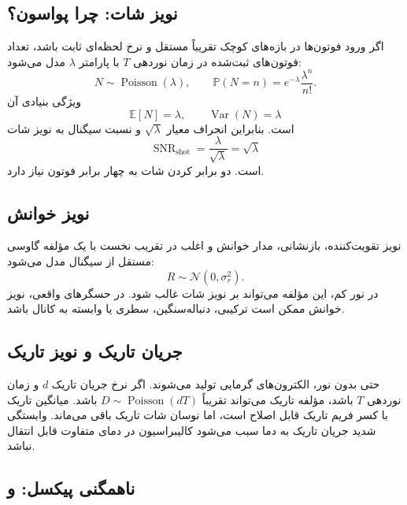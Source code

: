 \documentclass[12pt,openany,oneside]{book}
\newcommand{\E}{\mathbb{E}}
\newcommand{\Var}{\operatorname{Var}}
\newcommand{\Prob}{\mathbb{P}}
\newcommand{\Normal}{\mathcal{N}}
\newcommand{\Poisson}{\operatorname{Poisson}}
\newcommand{\SNR}{\operatorname{SNR}}
\begin{document}
\subsection{نویز شات: چرا پواسون؟}

اگر ورود فوتون‌ها در بازه‌های کوچک تقریباً مستقل و نرخ لحظه‌ای ثابت باشد، تعداد فوتون‌های ثبت‌شده در
زمان نوردهی \(T\) با پارامتر \(\lambda\) مدل می‌شود:
\begin{equation}
N\sim\Poisson(\lambda),
\qquad
\Prob(N=n)=e^{-\lambda}\frac{\lambda^n}{n!}.
\end{equation}
ویژگی بنیادی آن
\begin{equation}
\E[N]=\lambda,
\qquad
\Var(N)=\lambda
\end{equation}
است. بنابراین انحراف معیار \(\sqrt\lambda\) و نسبت سیگنال به نویز شات
\begin{equation}
\SNR_{\mathrm{shot}}=\frac{\lambda}{\sqrt\lambda}=\sqrt\lambda
\end{equation}
است. دو برابر کردن  شات به چهار برابر فوتون نیاز دارد.

\subsection{نویز خوانش}

نویز تقویت‌کننده، بازنشانی، مدار خوانش و  اغلب در تقریب نخست با یک مؤلفه گاوسی مستقل از سیگنال
مدل می‌شود:
\begin{equation}
R\sim\Normal(0,\sigma_r^2).
\end{equation}
در نور کم، این مؤلفه می‌تواند بر نویز شات غالب شود. در حسگرهای واقعی، نویز خوانش ممکن است ترکیبی،
دنباله‌سنگین، سطری یا وابسته به کانال باشد.

\subsection{جریان تاریک و نویز تاریک}

حتی بدون نور، الکترون‌های گرمایی تولید می‌شوند. اگر نرخ جریان تاریک \(d\) و زمان نوردهی \(T\) باشد،
مؤلفه تاریک می‌تواند تقریباً \(D\sim\Poisson(dT)\) باشد. میانگین تاریک با کسر فریم تاریک قابل اصلاح است،
اما نوسان شات تاریک باقی می‌ماند. وابستگی شدید جریان تاریک به دما سبب می‌شود کالیبراسیون در دمای متفاوت
قابل انتقال نباشد.

\subsection{ناهمگنی پیکسل:  و }
\end{document}
